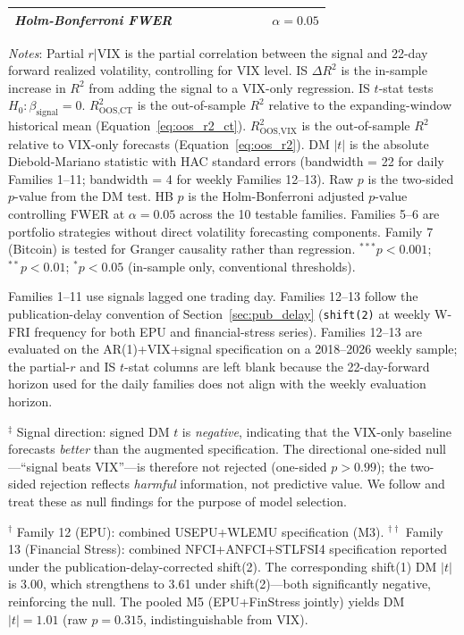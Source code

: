 \documentclass[12pt,a4paper]{article}
\begin{document}
\begin{table}[H]
\begin{threeparttable}
{\begin{tabular}{@{}clcccccccc@{}}
\multicolumn{2}{l}{\textit{Holm-Bonferroni FWER}} & & & & & & & & $\alpha = 0.05$ \\
\bottomrule
\end{tabular}%
}
\begin{tablenotes}
\small
\item \textit{Notes}: Partial $r|\text{VIX}$ is the partial correlation between the signal and 22-day forward realized volatility, controlling for VIX level. IS $\Delta R^2$ is the in-sample increase in $R^2$ from adding the signal to a VIX-only regression. IS $t$-stat tests $H_0: \beta_{\text{signal}} = 0$. $R^2_{\text{OOS,CT}}$ is the \citet{campbell2008} out-of-sample $R^2$ relative to the expanding-window historical mean (Equation~\ref{eq:oos_r2_ct}). $R^2_{\text{OOS,VIX}}$ is the out-of-sample $R^2$ relative to VIX-only forecasts (Equation~\ref{eq:oos_r2}). DM $|t|$ is the absolute Diebold-Mariano statistic with \citet{newey1987} HAC standard errors (bandwidth = 22 for daily Families 1--11; bandwidth = 4 for weekly Families 12--13). Raw $p$ is the two-sided $p$-value from the DM test. HB $p$ is the Holm-Bonferroni adjusted $p$-value controlling FWER at $\alpha = 0.05$ across the 10 testable families. Families 5--6 are portfolio strategies without direct volatility forecasting components. Family 7 (Bitcoin) is tested for Granger causality rather than regression. $^{***}p<0.001$; $^{**}p<0.01$; $^{*}p<0.05$ (in-sample only, conventional thresholds).
\item Families 1--11 use signals lagged one trading day. Families 12--13 follow the publication-delay convention of Section~\ref{sec:pub_delay} (\texttt{shift(2)} at weekly W-FRI frequency for both EPU and financial-stress series). Families 12--13 are evaluated on the AR(1)+VIX+signal specification on a 2018--2026 weekly sample; the partial-$r$ and IS $t$-stat columns are left blank because the 22-day-forward horizon used for the daily families does not align with the weekly evaluation horizon.
\item $^{\ddagger}$ Signal direction: signed DM $t$ is \emph{negative}, indicating that the VIX-only baseline forecasts \emph{better} than the augmented specification. The directional one-sided null---``signal beats VIX''---is therefore not rejected (one-sided $p>0.99$); the two-sided rejection reflects \emph{harmful} information, not predictive value. We follow \citet{harvey2016} and treat these as null findings for the purpose of model selection.
\item $^{\dagger}$ Family 12 (EPU): combined USEPU+WLEMU specification (M3). $^{\dagger\dagger}$ Family 13 (Financial Stress): combined NFCI+ANFCI+STLFSI4 specification reported under the publication-delay-corrected shift(2). The corresponding shift(1) DM $|t|$ is 3.00, which strengthens to 3.61 under shift(2)---both significantly negative, reinforcing the null. The pooled M5 (EPU+FinStress jointly) yields DM $|t|=1.01$ (raw $p=0.315$, indistinguishable from VIX).

\end{tablenotes}
\end{threeparttable}
\end{table}
\end{document}
